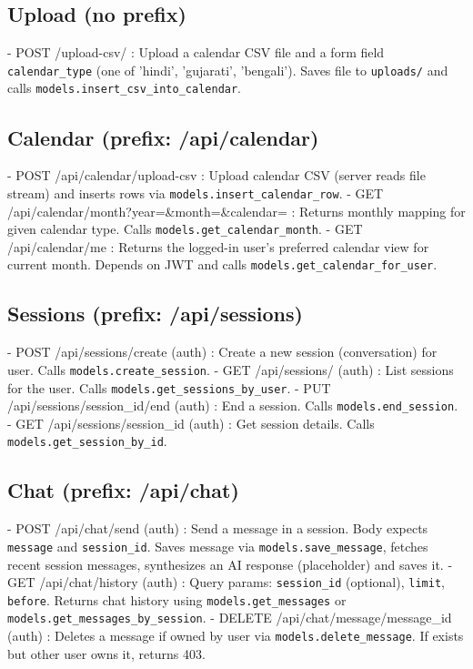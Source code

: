 \documentclass[11pt]{article}
\begin{document}
\subsection*{Upload (no prefix)}
- POST /upload-csv/ : Upload a calendar CSV file and a form field \texttt{calendar\_type} (one of 'hindi', 'gujarati', 'bengali'). Saves file to \texttt{uploads/} and calls \texttt{models.insert\_csv\_into\_calendar}.

\subsection*{Calendar (prefix: /api/calendar)}
- POST /api/calendar/upload-csv : Upload calendar CSV (server reads file stream) and inserts rows via \texttt{models.insert\_calendar\_row}.
- GET /api/calendar/month?year=&month=&calendar= : Returns monthly mapping for given calendar type. Calls \texttt{models.get\_calendar\_month}.
- GET /api/calendar/me : Returns the logged-in user's preferred calendar view for current month. Depends on JWT and calls \texttt{models.get\_calendar\_for\_user}.

\subsection*{Sessions (prefix: /api/sessions)}
- POST /api/sessions/create (auth) : Create a new session (conversation) for user. Calls \texttt{models.create\_session}.
- GET /api/sessions/ (auth) : List sessions for the user. Calls \texttt{models.get\_sessions\_by\_user}.
- PUT /api/sessions/{session\_id}/end (auth) : End a session. Calls \texttt{models.end\_session}.
- GET /api/sessions/{session\_id} (auth) : Get session details. Calls \texttt{models.get\_session\_by\_id}.

\subsection*{Chat (prefix: /api/chat)}
- POST /api/chat/send (auth) : Send a message in a session. Body expects \texttt{message} and \texttt{session\_id}. Saves message via \texttt{models.save\_message}, fetches recent session messages, synthesizes an AI response (placeholder) and saves it.
- GET /api/chat/history (auth) : Query params: \texttt{session\_id} (optional), \texttt{limit}, \texttt{before}. Returns chat history using \texttt{models.get\_messages} or \texttt{models.get\_messages\_by\_session}.
- DELETE /api/chat/message/{message\_id} (auth) : Deletes a message if owned by user via \texttt{models.delete\_message}. If exists but other user owns it, returns 403.
\end{document}
